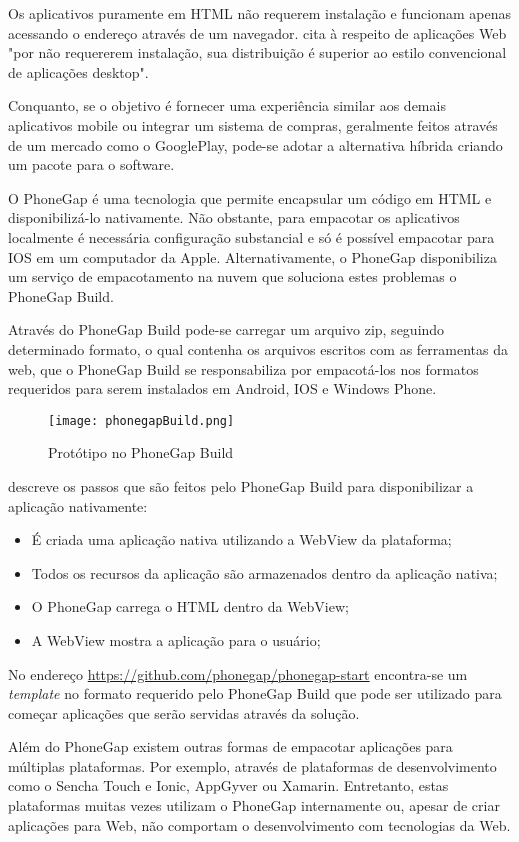 Os aplicativos puramente em HTML não requerem instalação e
funcionam apenas acessando o endereço através de um navegador.
\citet{browserGamesTechnologyAndFuture} cita à respeito de
aplicações Web "por não requererem instalação, sua distribuição é
superior ao estilo convencional de aplicações desktop".

Conquanto, se o objetivo é fornecer uma experiência similar aos
demais aplicativos mobile ou integrar um sistema de compras, geralmente
feitos através de um mercado como o GooglePlay, pode-se adotar a
alternativa híbrida criando um pacote para o software.

O PhoneGap é uma tecnologia que permite encapsular um código em
HTML e disponibilizá-lo nativamente. Não obstante, para empacotar
os aplicativos localmente é necessária configuração substancial
e só é possível empacotar para IOS em um computador da Apple.
Alternativamente, o PhoneGap disponibiliza um serviço de empacotamento
na nuvem que soluciona estes problemas o PhoneGap Build.

Através do PhoneGap Build pode-se carregar um arquivo zip, seguindo
determinado formato, o qual contenha os arquivos escritos com as
ferramentas da web, que o PhoneGap Build se responsabiliza por
empacotá-los nos formatos requeridos para serem instalados em Android,
IOS e Windows Phone.

\begin{figure}[H]
    \centering
    \texttt{[image: phonegapBuild.png]}
    \caption{Protótipo no PhoneGap Build}
\end{figure}

\citet{publishHtml5} descreve os passos que são feitos pelo PhoneGap Build para
disponibilizar a aplicação nativamente:

\begin{itemize}
\item É criada uma aplicação nativa utilizando a WebView da plataforma;
\item Todos os recursos da aplicação são armazenados dentro da aplicação nativa;
\item O PhoneGap carrega o HTML dentro da WebView;
\item A WebView mostra a aplicação para o usuário;
\end{itemize}

No endereço \url{https://github.com/phonegap/phonegap-start}
encontra-se um \textit{template} no formato requerido pelo PhoneGap
Build que pode ser utilizado para começar aplicações que serão
servidas através da solução.

Além do PhoneGap existem outras formas de empacotar aplicações
para múltiplas plataformas. Por exemplo, através de plataformas de
desenvolvimento como o Sencha Touch e Ionic, AppGyver ou Xamarin.
Entretanto, estas plataformas muitas vezes utilizam o PhoneGap
internamente ou, apesar de criar aplicações para Web, não comportam o
desenvolvimento com tecnologias da Web.
